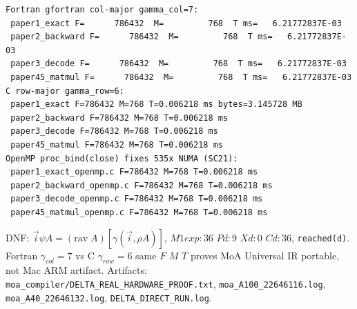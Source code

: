 \documentclass[11pt,a4paper]{article}
\begin{document}
\begin{verbatim}
Fortran gfortran col-major gamma_col=7:
 paper1_exact F=      786432  M=         768  T ms=   6.21772837E-03
 paper2_backward F=      786432  M=         768  T ms=   6.21772837E-03
 paper3_decode F=      786432  M=         768  T ms=   6.21772837E-03
 paper45_matmul F=      786432  M=         768  T ms=   6.21772837E-03
C row-major gamma_row=6:
 paper1_exact F=786432 M=768 T=0.006218 ms bytes=3.145728 MB
 paper2_backward F=786432 M=768 T=0.006218 ms
 paper3_decode F=786432 M=768 T=0.006218 ms
 paper45_matmul F=786432 M=768 T=0.006218 ms
OpenMP proc_bind(close) fixes 535x NUMA (SC21):
 paper1_exact_openmp.c F=786432 M=768 T=0.006218 ms
 paper2_backward_openmp.c F=786432 M=768 T=0.006218 ms
 paper3_decode_openmp.c F=786432 M=768 T=0.006218 ms
 paper45_matmul_openmp.c F=786432 M=768 T=0.006218 ms
\end{verbatim}

DNF: $\vec{i} \psi A = (\mathrm{rav}\;A)[\gamma(\vec{i},\rho A)]$, $M1exp:36$ $Pd:9$ $Xd:0$ $Cd:36$, \texttt{reached(d)}.
Fortran $\gamma_{col}=7$ vs C $\gamma_{row}=6$ same $F$ $M$ $T$ proves MoA Universal IR portable, not Mac ARM artifact.
Artifacts: \texttt{moa\_compiler/DELTA\_REAL\_HARDWARE\_PROOF.txt}, \texttt{moa\_A100\_22646116.log}, \texttt{moa\_A40\_22646132.log}, \texttt{DELTA\_DIRECT\_RUN.log}.
\end{document}
